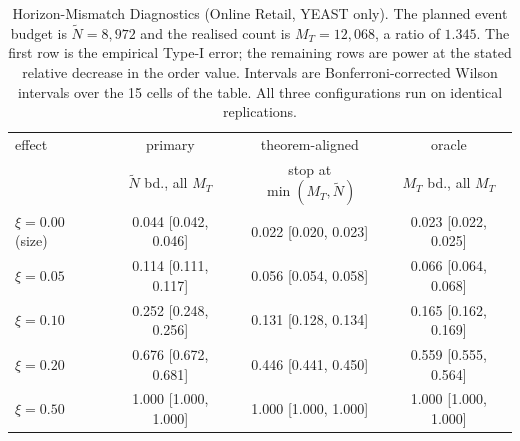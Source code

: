 \begin{table}[ht]
    \caption{Horizon-Mismatch Diagnostics (Online Retail, YEAST only). The planned event budget is $\tilde N = 8,972$ and the realised count is $M_T = 12,068$, a ratio of $1.345$. The first row is the empirical Type-I error; the remaining rows are power at the stated relative decrease in the order value. Intervals are Bonferroni-corrected Wilson intervals over the 15 cells of the table. All three configurations run on identical replications.}\label{tbl:horizon-diagnostics}
    \centering
    \begin{footnotesize}
    \setlength{\tabcolsep}{4pt}
\begin{tabular}{lccc}
  \hline
 effect & primary & theorem-aligned & oracle \\
  & $\tilde N$ bd., all $M_T$ & stop at $\min(M_T,\tilde N)$ & $M_T$ bd., all $M_T$ \\
  \hline
  $\xi = 0.00$ (size) & 0.044 [0.042, 0.046] & 0.022 [0.020, 0.023] & 0.023 [0.022, 0.025] \\
  $\xi = 0.05$ & 0.114 [0.111, 0.117] & 0.056 [0.054, 0.058] & 0.066 [0.064, 0.068] \\
  $\xi = 0.10$ & 0.252 [0.248, 0.256] & 0.131 [0.128, 0.134] & 0.165 [0.162, 0.169] \\
  $\xi = 0.20$ & 0.676 [0.672, 0.681] & 0.446 [0.441, 0.450] & 0.559 [0.555, 0.564] \\
  $\xi = 0.50$ & 1.000 [1.000, 1.000] & 1.000 [1.000, 1.000] & 1.000 [1.000, 1.000] \\
   \hline
\end{tabular}
    \end{footnotesize}
\end{table}
